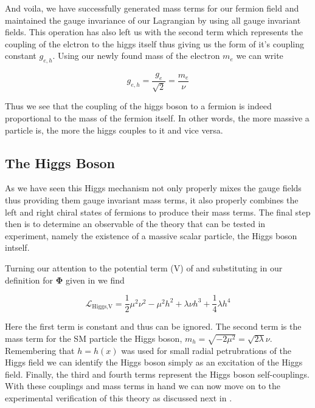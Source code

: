 And voila, we have successfully generated mass terms for our fermion field and
maintained the gauge invariance of our Lagrangian by using all gauge invariant
fields.  This operation has also left us with the second term which represents the coupling
of the elctron to the higgs itself thus giving us the form of it's coupling
constant $g_{e,h}$.  Using our newly found mass of the electron $m_{e}$ we can
write

\begin{equation}
g_{e,h} = \frac{g_{e}}{\sqrt{2}} = \frac{m_{e}}{\nu}
\end{equation}

Thus we see that the coupling of the higgs boson to a fermion is indeed
proportional to the mass of the fermion itself.  In other words, the more
massive a particle is, the more the higgs couples to it and vice versa.
 
\subsection{The Higgs Boson}

As we have seen this Higgs mechanism not only properly mixes the gauge fields
thus providing them gauge invariant mass terms, it also properly combines the
left and right chiral states of fermions to produce their mass terms.  The final
step then is to determine an observable of the theory that can be tested in
experiment, namely the existence of a massive scalar particle, the Higgs boson
intself.

Turning our attention to the potential term (V) of
 and substituting in our definition for
$\boldsymbol{\Phi}$ given in  we find

\begin{equation}
\mathcal{L}_\text{Higgs,V} = \frac{1}{2} \mu^{2} \nu^{2} - \mu^{2} h^{2} +
\lambda \nu h^{3} + \frac{1}{4} \lambda h^{4}
\end{equation}

Here the first term is constant and thus can be ignored.  The second term is the
mass term for the SM particle the Higgs boson, $m_h = \sqrt{-2\mu^{2}} =
\sqrt{2\lambda}\nu$. Remembering that $h = h(x)$ was used for small radial
petrubrations of the Higgs field we can identify the Higgs boson simply as an
excitation of the Higgs field.  Finally, the third and fourth terms represent
the Higgs boson self-couplings.  With these couplings and mass terms in hand we
can now move on to the experimental verification of this theory as discussed
next in .

